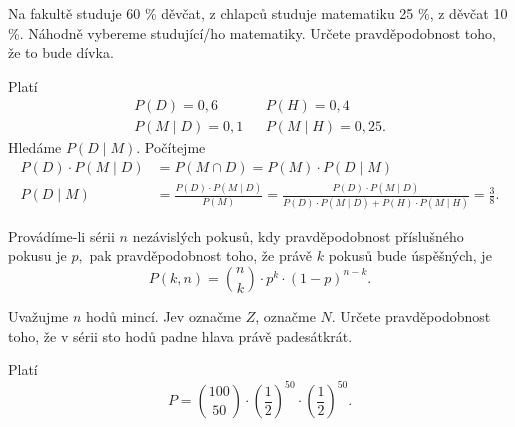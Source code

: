 \begin{priklad}
Na fakultě studuje 60 \% děvčat, z chlapců studuje matematiku 25 \%,
z děvčat 10 \%. Náhodně vybereme studující/ho matematiky. Určete
pravděpodobnost toho, že to bude dívka.
\end{priklad}

\begin{reseni}
Platí
\begin{align*}
P(D)=0{,}6 & & P(H)=0{,}4 \\
P(M \mid D)=0{,}1 & & P(M \mid H)=0{,}25.
\end{align*}
Hledáme $P(D \mid M).$ Počítejme
\begin{align*}
 P(D)\cdot P(M \mid D)&=P(M \cap D)=P(M)\cdot P(D \mid M)\\
 P(D \mid M) &= \frac{P(D)\cdot P(M \mid D)}{P(M)}=\frac{P(D)\cdot P(M \mid D)}{P(D)\cdot P(M\mid D)+P(H)\cdot P(M \mid H)}=\frac{3}{8}.
\end{align*}
\end{reseni}

\begin{veta}
    Provádíme-li sérii $n$ nezávislých pokusů, kdy pra\-vdě\-po\-dob\-nost příslušného
    pokusu je $p,$ pak pravděpodobnost toho, že právě $k$ pokusů bude úspěšných, je
    $$P(k,n)=\binom{n}{k}\cdot p^k \cdot (1-p)^{n-k}.$$
\end{veta}

\begin{priklad}
Uvažujme $n$ hodů mincí. Jev  označme $Z$,  označme $N$.
Určete pravděpodobnost toho, že v sérii sto hodů padne hlava právě padesátkrát.
\end{priklad}

\begin{reseni}
Platí
$$P=\binom{100}{50}\cdot \left ( \frac{1}{2} \right )^{50}\cdot \left ( \frac{1}{2} \right )^{50}.  $$
\end{reseni}
